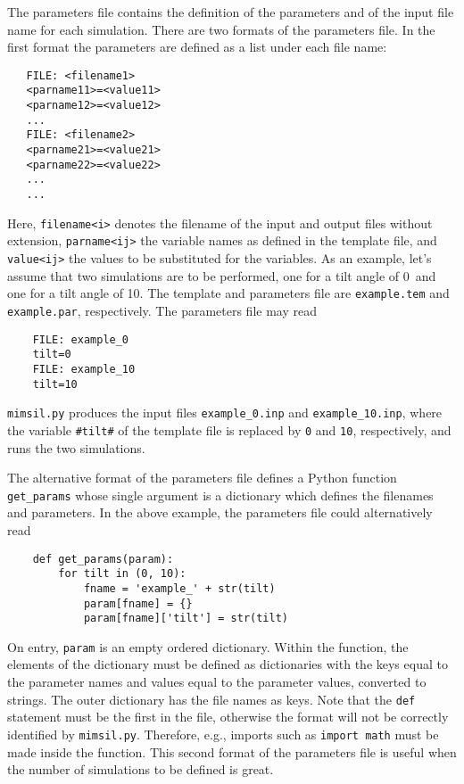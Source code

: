 The parameters file contains the definition of the parameters and of the input
file name for each simulation. There are two formats of the parameters
file. In the first format the parameters are defined as a list under each file
name:
%
\begin{verbatim}
   FILE: <filename1>
   <parname11>=<value11>
   <parname12>=<value12>
   ...
   FILE: <filename2>
   <parname21>=<value21>
   <parname22>=<value22>
   ...
   ...
\end{verbatim}
%
Here, \texttt{filename<i>} denotes the filename of the input and output files
without extension, \texttt{parname<ij>} the variable names as defined in the
template file, and \texttt{value<ij>} the values to be substituted for the
variables. As an example, let's assume that two simulations are to be
performed, one for a tilt angle of 0\textdegree\ and one for a tilt angle of
10\textdegree. The template and parameters file are \texttt{example.tem} and
\texttt{example.par}, respectively. The parameters file may read
%
\begin{verbatim}
    FILE: example_0
    tilt=0
    FILE: example_10
    tilt=10
\end{verbatim}
%
\texttt{mimsil.py} produces the input files \texttt{example\_0.inp} and
\texttt{example\_10.inp}, where the variable \texttt{\#tilt\#} of the template
file is replaced by \texttt{0} and \texttt{10}, respectively, and runs the two
simulations.

The alternative format of the parameters file defines a Python function
\texttt{get\_params} whose single argument is a dictionary which defines the
filenames and parameters. In the above example, the parameters file could
alternatively read 
%
\begin{verbatim}
    def get_params(param):
        for tilt in (0, 10):
            fname = 'example_' + str(tilt)
            param[fname] = {}
            param[fname]['tilt'] = str(tilt)
\end{verbatim}
%
On entry, \texttt{param} is an empty ordered dictionary. Within the function,
the elements of the dictionary must be defined as dictionaries with the keys equal
to the parameter names and values equal to the parameter values, converted to
strings. The outer dictionary has the file names as keys. Note that the
\texttt{def} statement must be the first in the file, otherwise the format will
not be correctly identified by \texttt{mimsil.py}. Therefore, e.g., imports such
as \texttt{import math} must be made inside the function. This second format of
the parameters file is useful when the number of simulations to be defined is
great.

